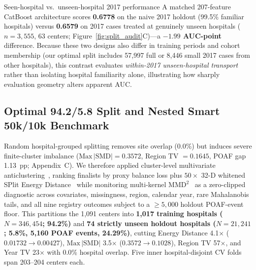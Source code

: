\begin{callout}{Seen-hospital vs.\ unseen-hospital 2017 performance}
A matched 207-feature CatBoost architecture scores \textbf{0.6778} on the naive 2017 holdout (99.5\% familiar hospitals) versus \textbf{0.6579} on 2017 cases treated at genuinely unseen hospitals ($n=3{,}555$, 63 centers; Figure~\ref{fig:split_audit}C)---a \textbf{$-1.99$ AUC-point} difference. Because these two designs also differ in training periods and cohort membership (our optimal split includes 57,997 full or 8,446 small 2017 cases from other hospitals), this contrast evaluates \emph{within-2017 unseen-hospital transport} rather than isolating hospital familiarity alone, illustrating how sharply evaluation geometry alters apparent AUC.
\end{callout}

\subsection{Optimal 94.2/5.8 Split and Nested Smart 50k/10k Benchmark}
Random hospital-grouped splitting removes site overlap (0.0\%) but induces severe finite-cluster imbalance ($\mathrm{Max}\,|\mathrm{SMD}| = 0.3572$, Region TV $= 0.1645$, POAF gap 1.13~pp; Appendix~C). We therefore applied cluster-level multivariate anticlustering~\cite{papenberg2021anticlustering}, ranking finalists by proxy balance loss plus $50\times$ 32-D whitened SPlit Energy Distance~\cite{joseph2022split,szekely2013energy} while monitoring multi-kernel $\mathrm{MMD}^2$~\cite{gretton2012kernel} as a zero-clipped diagnostic across covariates, missingness, region, calendar year, rare Mahalanobis tails, and all nine registry outcomes subject to a $\ge 5{,}000$ holdout POAF-event floor. This partitions the 1,091 centers into \textbf{1,017 training hospitals ($N=346{,}454$; 94.2\%)} and \textbf{74 strictly unseen holdout hospitals ($N=21{,}241$; 5.8\%, 5,160 POAF events, 24.29\%)}, cutting Energy Distance 4.1$\times$ ($0.01732 \to 0.00427$), $\mathrm{Max}\,|\mathrm{SMD}|$ 3.5$\times$ ($0.3572 \to 0.1028$), Region TV 57$\times$, and Year TV 23$\times$ with 0.0\% hospital overlap. Five inner hospital-disjoint CV folds span 203--204 centers each.

